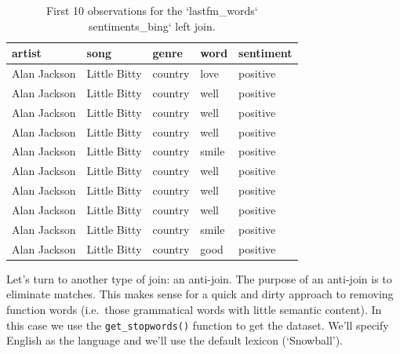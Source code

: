 \documentclass[
]{article}
\begin{document}
\begin{table}

\caption{\label{tab:td-lastfm-words-bing-left-joing-filter}First 10 observations for the `lastfm_words` sentiments_bing` left join.}
\centering
\begin{tabular}[t]{lllll}
\toprule
artist & song & genre & word & sentiment\\
\midrule
Alan Jackson & Little Bitty & country & love & positive\\
Alan Jackson & Little Bitty & country & well & positive\\
Alan Jackson & Little Bitty & country & well & positive\\
Alan Jackson & Little Bitty & country & well & positive\\
Alan Jackson & Little Bitty & country & smile & positive\\
\addlinespace
Alan Jackson & Little Bitty & country & well & positive\\
Alan Jackson & Little Bitty & country & well & positive\\
Alan Jackson & Little Bitty & country & well & positive\\
Alan Jackson & Little Bitty & country & smile & positive\\
Alan Jackson & Little Bitty & country & good & positive\\
\bottomrule
\end{tabular}
\end{table}

Let's turn to another type of join: an anti-join. The purpose of an anti-join is to eliminate matches. This makes sense for a quick and dirty approach to removing function words (i.e.~those grammatical words with little semantic content). In this case we use the \texttt{get\_stopwords()} function to get the dataset. We'll specify English as the language and we'll use the default lexicon (`Snowball').
\end{document}
